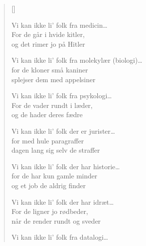 {\begin{multicols}{3}
\begin{verse}[\versewidth]

Vi kan ikke li' folk fra medicin\ldots\\
For de går i hvide kitler,\\
og det rimer jo på Hitler

Vi kan ikke li' folk fra molekylær
(biologi)\ldots\\
for de kloner små kaniner\\
splejser dem med appelsiner

Vi kan ikke li' folk fra psykologi\ldots\\
For de vader rundt i læder,\\
og de hader deres fædre

Vi kan ikke li' folk der er jurister\ldots\\
for med hule paragraffer\\
dagen lang sig selv de straffer

Vi kan ikke li' folk der har historie\ldots\\
for de har kun gamle minder\\
og et job de aldrig finder

Vi kan ikke li' folk der har idræt\ldots\\
For de ligner jo rødbeder,\\
når de render rundt og sveder

Vi kan ikke li' folk fra datalogi\ldots
\end{verse}
\end{multicols}
}

\newpage

